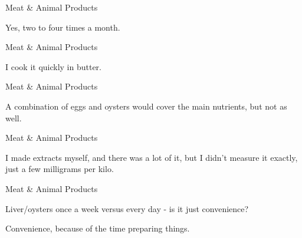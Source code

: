 \documentclass[11pt,oneside,openany,extrafontsizes]{memoir}
\begin{document}
\begin{standalonequote}{Meat \& Animal Products}

    \begin{answer}
        Yes, two to four times a month.
    \end{answer}
\end{standalonequote}

\begin{standalonequote}{Meat \& Animal Products}

    \begin{answer}
        I cook it quickly in butter.
    \end{answer}
\end{standalonequote}

\begin{standalonequote}{Meat \& Animal Products}

    \begin{answer}
        A combination of eggs and oysters would cover the main nutrients, but not as well.
    \end{answer}
\end{standalonequote}

\begin{standalonequote}{Meat \& Animal Products}

    \begin{answer}
        I made extracts myself, and there was a lot of it, but I didn't measure it exactly, just a few milligrams per kilo.
    \end{answer}
\end{standalonequote}

\begin{qaexchange}{Meat \& Animal Products}

    \begin{question}
        Liver/oysters once a week versus every day - is it just convenience?
    \end{question}

    \begin{answer}
        Convenience, because of the time preparing things.
    \end{answer}
\end{qaexchange}
\end{document}
